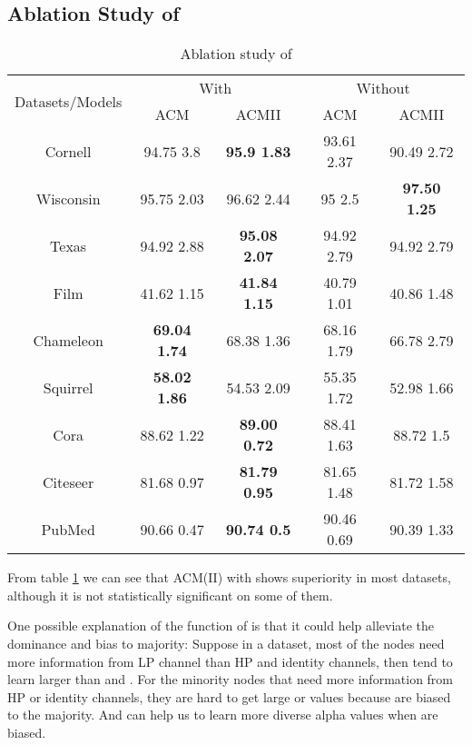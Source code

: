 \documentclass{article}
\newcommand{\0}{{\boldsymbol{0}}}
\newcommand{\6}{{\partial}}
\newcommand{\8}{{\infty}}
\newcommand{\4}{{\nabla}}
\begin{document}
\subsection{Ablation Study of }
\label{appendix:ablation_w_mix}
\begin{table}[htbp]
  \centering
  \caption{Ablation study of }
    \begin{tabular}{c|cc|cc}
    \toprule
    \toprule
    \multirow{2}[4]{*}{Datasets/Models} & \multicolumn{2}{c|}{With } & \multicolumn{2}{c}{Without } \\
\cmidrule{2-5}          & ACM   & ACMII & ACM   & ACMII \\
    \midrule
    Cornell & 94.75  3.8 & \cellcolor[rgb]{ .647,  .647,  .647}\textbf{95.9  1.83} & 93.61  2.37 & 90.49  2.72 \\
    Wisconsin & 95.75  2.03 & 96.62  2.44 & 95  2.5 & \cellcolor[rgb]{ .647,  .647,  .647}\textbf{97.50  1.25} \\
    Texas & 94.92  2.88 & \cellcolor[rgb]{ .647,  .647,  .647}\textbf{95.08  2.07} & 94.92  2.79 & 94.92  2.79 \\
    Film  & 41.62  1.15 & \cellcolor[rgb]{ .647,  .647,  .647}\textbf{41.84  1.15} & 40.79  1.01 & 40.86  1.48 \\
    Chameleon & \cellcolor[rgb]{ .647,  .647,  .647}\textbf{69.04  1.74} & 68.38  1.36 & 68.16  1.79 & 66.78  2.79 \\
    Squirrel & \cellcolor[rgb]{ .647,  .647,  .647}\textbf{58.02  1.86} & 54.53  2.09 & 55.35  1.72 & 52.98  1.66 \\
    Cora  & 88.62  1.22 & \cellcolor[rgb]{ .647,  .647,  .647}\textbf{89.00  0.72} & 88.41  1.63 & 88.72  1.5 \\
    Citeseer & 81.68  0.97 & \cellcolor[rgb]{ .647,  .647,  .647}\textbf{81.79  0.95} & 81.65  1.48 & 81.72  1.58 \\
    PubMed & 90.66  0.47 & \cellcolor[rgb]{ .647,  .647,  .647}\textbf{90.74  0.5} & 90.46  0.69 & 90.39  1.33 \\
    \bottomrule
    \bottomrule
    \end{tabular}\label{tab:ablation_W_mix}\end{table} From table \ref{tab:ablation_W_mix} we can see that ACM(II) with  shows superiority in most datasets, although it is not statistically significant on some of them.

One possible explanation of the function of  is that it could help alleviate the dominance and bias to majority: Suppose in a dataset, most of the nodes need more information from LP channel than HP and identity channels, then  tend to learn larger  than  and . For the minority nodes that need more information from HP or identity channels, they are hard to get large  or  values because  are biased to the majority. And  can help us to learn more diverse alpha values when  are biased.
\end{document}
